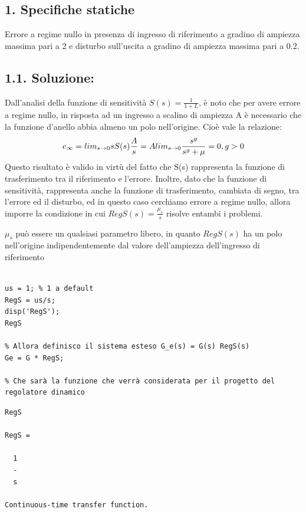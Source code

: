 \documentclass{article}
\begin{document}
\subsection*{1. Specifiche statiche}

\begin{par}
Errore a regime nullo in presenza di ingresso di riferimento a gradino di ampiezza massima pari a 2
e disturbo sull'uscita a gradino di ampiezza massima pari a 0.2.
\end{par}


\subsection*{1.1. Soluzione:}

\begin{par}
Dall'analisi della funzione di sensitività  $ S(s) = \frac{1}{1 + L}  $, è noto che
per avere errore a regime nullo, in risposta ad un ingresso a scalino di ampiezza A
è necessario che la funzione d'anello  abbia almeno un polo nell'origine.
Cioè vale la relazione:
$$ e_\infty = lim_{s \to 0} sS(s)\frac{A}{s} = A lim_{s \to 0} \frac{s^g}{s^g + \mu} = 0 \\, g > 0 $$
Questo risultato è valido in virtù del fatto che  S(s)  rappresenta la
funzione di trasferimento tra il riferimento e l'errore.
Inoltre, dato che la funzione di sensitività, rappresenta anche la
funzione di trasferimento, cambiata di segno, tra l'errore ed il
disturbo, ed in questo caso cerchiamo errore a regime nullo, allora
imporre la condizione in cui $ RegS(s) = \frac{\mu_s}{s} $ risolve entambi i problemi.


$ \mu_s  $ può essere un qualsiasi parametro libero, in quanto $ RegS(s) $  ha un polo
nell'origine indipendentemente dal valore dell'ampiezza dell'ingresso di
riferimento
\end{par}

\begin{verbatim}

us = 1; % 1 a default
RegS = us/s;
disp('RegS');
RegS

% Allora definisco il sistema esteso G_e(s) = G(s) RegS(s)
Ge = G * RegS;

% Che sarà la funzione che verrà considerata per il progetto del regolatore dinamico
\end{verbatim}

        \color{lightgray} \begin{verbatim}RegS

RegS =
 
  1
  -
  s
 
Continuous-time transfer function.

\end{verbatim} \color{black}
    
\end{document}
